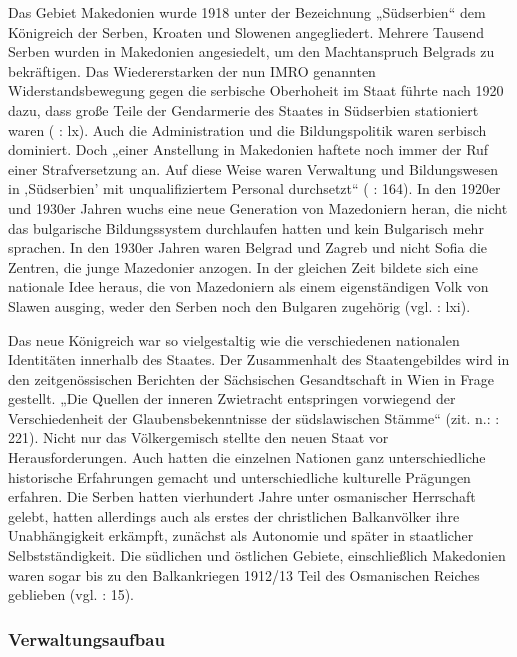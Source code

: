 Das Gebiet Makedonien wurde 1918 unter der Bezeichnung „Südserbien“ dem Königreich der Serben, Kroaten und Slowenen angegliedert. Mehrere Tausend Serben wurden in Makedonien angesiedelt, um den Machtanspruch Belgrads zu bekräftigen. Das Wiedererstarken der nun IMRO genannten Widerstandsbewegung gegen die serbische Oberhoheit im Staat führte nach 1920 dazu, dass große Teile der Gendarmerie des Staates in Südserbien stationiert waren (\cite{bech09} :  lx). Auch die Administration und die Bildungspolitik waren serbisch dominiert. Doch „einer Anstellung in Makedonien haftete noch immer der Ruf einer Strafversetzung an. Auf diese Weise waren Verwaltung und Bildungswesen in ‚Südserbien’ mit unqualifiziertem Personal durchsetzt“ (\cite{opfer} : 164). In den 1920er und 1930er Jahren wuchs eine neue Generation von Mazedoniern heran, die nicht das bulgarische Bildungssystem durchlaufen hatten und kein Bulgarisch mehr sprachen. In den 1930er Jahren waren Belgrad und Zagreb und nicht Sofia die Zentren, die junge Mazedonier anzogen. In der gleichen Zeit bildete sich eine nationale Idee heraus, die von Mazedoniern als einem eigenständigen Volk von Slawen ausging, weder den Serben noch den Bulgaren zugehörig (vgl. \cite{bech09} : lxi).\par

Das neue Königreich war so vielgestaltig wie die verschiedenen nationalen Identitäten innerhalb des Staates. Der Zusammenhalt des Staatengebildes wird in den zeitgenössischen Berichten der Sächsischen Gesandtschaft in Wien in Frage gestellt. „Die Quellen der inneren Zwietracht entspringen vorwiegend der Verschiedenheit der Glaubensbekenntnisse der südslawischen Stämme“ (zit. n.: \cite{opitz} : 221). Nicht nur das Völkergemisch stellte den neuen Staat vor Herausforderungen. Auch hatten die einzelnen Nationen ganz unterschiedliche historische Erfahrungen gemacht und unterschiedliche kulturelle Prägungen erfahren. Die Serben hatten vierhundert Jahre unter osmanischer Herrschaft gelebt, hatten allerdings auch als erstes der christlichen Balkanvölker ihre Unabhängigkeit erkämpft, zunächst als Autonomie und später in staatlicher Selbstständigkeit. Die südlichen und östlichen Gebiete, einschließlich Makedonien waren sogar bis zu den Balkankriegen 1912/13 Teil des Osmanischen Reiches geblieben (vgl. \cite{libal} : 15).
\par

\subsubsection{Verwaltungsaufbau}

